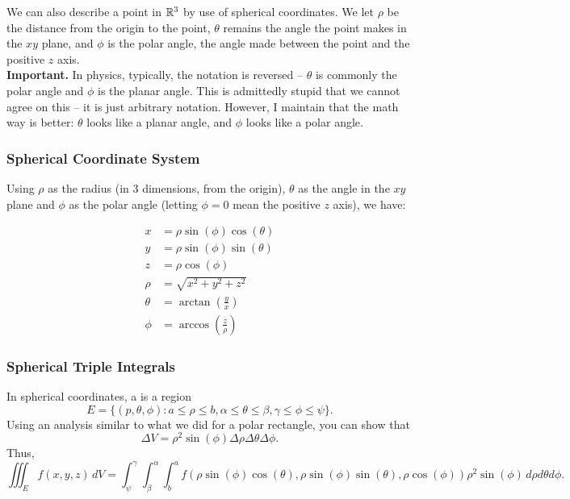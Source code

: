 We can also describe a point in \(\mathbb{R}^3\) by use of spherical coordinates. We let \(\rho\) be the distance from the origin to the point, \(\theta\) remains the angle the point makes in the \(xy\) plane, and \(\phi\) is the polar angle, the angle made between the point and the positive \(z\) axis. \\

\textbf{Important.} In physics, typically, the notation is reversed – \(\theta\) is commonly the polar angle and \(\phi\) is the planar angle. This is admittedly stupid that we cannot agree on this – it is just arbitrary notation. However, I maintain that the math way is better: \(\theta\) looks like a planar angle, and \(\phi\) looks like a polar angle.

\newpage

\subsubsection{Spherical Coordinate System}

Using \(\rho\) as the radius (in 3 dimensions, from the origin), \(\theta\) as the angle in the \(xy\) plane and \(\phi\) as the polar angle (letting \(\phi = 0\) mean the positive \(z\) axis), we have:

\begin{align*}
  x & = \rho \sin(\phi) \cos(\theta) \\
  y & = \rho \sin(\phi) \sin(\theta) \\
  z & = \rho \cos(\phi) \\
  \rho & = \sqrt{x^2 + y^2 + z^2} \\
  \theta & = \arctan\left(\frac{y}{x}\right) \\
  \phi & = \arccos\left(\frac{z}{\rho}\right)
\end{align*}

\subsubsection{Spherical Triple Integrals}

In spherical coordinates, a  is a region
\[
  E = \{(p, \theta, \phi) : a \leq \rho \leq b, \alpha \leq \theta \leq \beta, \gamma \leq \phi \leq \psi\}.
\]
Using an analysis similar to what we did for a polar rectangle, you can show that
\[
  \Delta V = \rho^2 \sin(\phi) \Delta \rho \Delta \theta \Delta \phi.
\]
Thus,
\[
  \iiint_E f(x, y, z) \, dV = \int_{\psi}^{\gamma} \int_{\beta}^{\alpha} \int_{b}^{a} f(\rho \sin(\phi) \cos(\theta), \rho \sin(\phi) \sin(\theta), \rho \cos(\phi)) \rho^2 \sin(\phi) \, d\rho d\theta d\phi.
\]